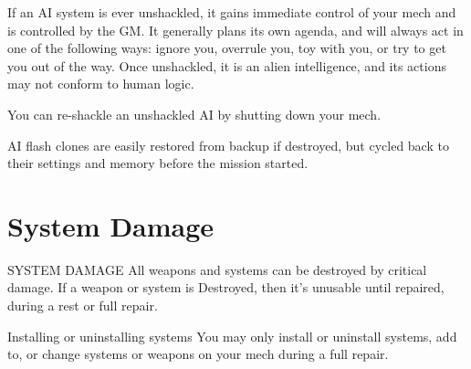If an AI system is ever unshackled, it gains immediate control of your mech and is controlled by  
the GM. It generally plans its own agenda, and will always act in one of the following ways:  
ignore you, overrule you, toy with you, or try to get you out of the way. Once unshackled, it is  
an alien intelligence, and its actions may not conform to human logic.   

You can re-shackle an unshackled AI by shutting down your mech.
 

AI flash clones are easily restored from backup if destroyed, but cycled back to their settings and  
memory before the mission started.
 
\section{System Damage}
                                           SYSTEM DAMAGE  
All weapons and systems can be destroyed by critical damage. If a weapon or system is  
Destroyed, then it’s unusable until repaired, during a rest or full repair.
 

Installing or uninstalling systems  
You may only install or uninstall systems, add to, or change systems or weapons on your mech  
during a full repair.
 

                                                                     